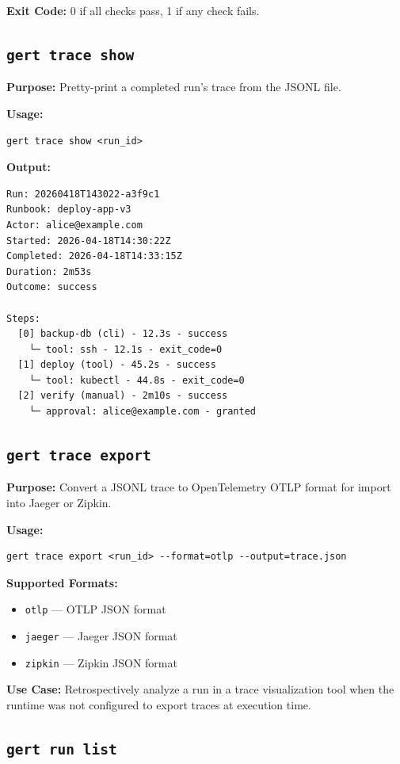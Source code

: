 \textbf{Exit Code:} 0 if all checks pass, 1 if any check fails.

\subsection{\texttt{gert trace show}}

\textbf{Purpose:} Pretty-print a completed run's trace from the JSONL file.

\textbf{Usage:}
\begin{verbatim}
gert trace show <run_id>
\end{verbatim}

\textbf{Output:}
\begin{verbatim}
Run: 20260418T143022-a3f9c1
Runbook: deploy-app-v3
Actor: alice@example.com
Started: 2026-04-18T14:30:22Z
Completed: 2026-04-18T14:33:15Z
Duration: 2m53s
Outcome: success

Steps:
  [0] backup-db (cli) - 12.3s - success
    └─ tool: ssh - 12.1s - exit_code=0
  [1] deploy (tool) - 45.2s - success
    └─ tool: kubectl - 44.8s - exit_code=0
  [2] verify (manual) - 2m10s - success
    └─ approval: alice@example.com - granted
\end{verbatim}

\subsection{\texttt{gert trace export}}

\textbf{Purpose:} Convert a JSONL trace to OpenTelemetry OTLP format for import into Jaeger or Zipkin.

\textbf{Usage:}
\begin{verbatim}
gert trace export <run_id> --format=otlp --output=trace.json
\end{verbatim}

\textbf{Supported Formats:}
\begin{itemize}
  \item \texttt{otlp} — OTLP JSON format
  \item \texttt{jaeger} — Jaeger JSON format
  \item \texttt{zipkin} — Zipkin JSON format
\end{itemize}

\textbf{Use Case:} Retrospectively analyze a run in a trace visualization tool when the runtime was not configured to export traces at execution time.

\subsection{\texttt{gert run list}}

